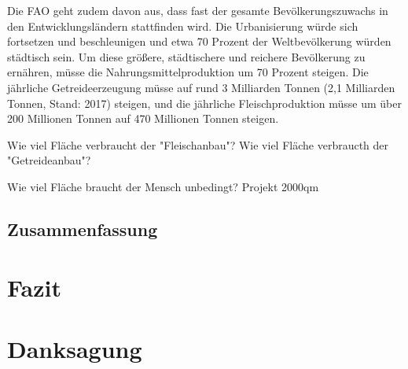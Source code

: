\documentclass{scrartcl}
\begin{document}
Die FAO geht zudem davon aus, dass fast der gesamte Bevölkerungszuwachs in den Entwicklungsländern stattfinden wird. Die Urbanisierung würde sich fortsetzen und beschleunigen und etwa 70 Prozent der Weltbevölkerung würden städtisch sein. Um diese größere, städtischere und reichere Bevölkerung zu ernähren, müsse die Nahrungsmittelproduktion um 70 Prozent steigen. Die jährliche Getreideerzeugung müsse auf rund 3 Milliarden Tonnen (2,1 Milliarden Tonnen, Stand: 2017)  steigen, und die jährliche Fleischproduktion müsse um über 200 Millionen Tonnen auf 470 Millionen Tonnen steigen.

Wie viel Fläche verbraucht der "Fleischanbau"?
Wie viel Fläche verbraucth der "Getreideanbau"?

Wie viel Fläche braucht der Mensch unbedingt?
    Projekt 2000qm


\subsection{Zusammenfassung}
\section{Fazit}

\section{Danksagung}

\newpage
\listoffigures

\begingroup
\singlespacing
\setlength\bibitemsep{10pt} %
\printbibliography
\endgroup
\end{document}
